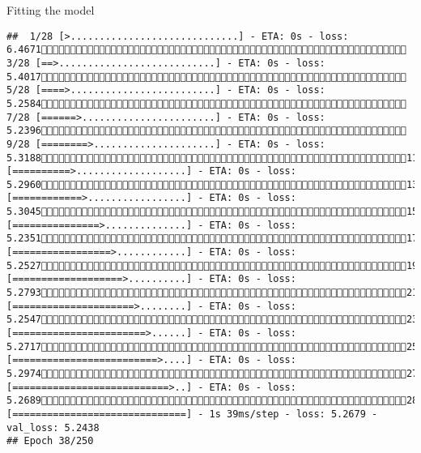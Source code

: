 \documentclass[
  ignorenonframetext,
]{beamer}
\begin{document}
\begin{frame}[fragile]{Fitting the model}
\begin{verbatim}
##  1/28 [>.............................] - ETA: 0s - loss: 6.4671 3/28 [==>...........................] - ETA: 0s - loss: 5.4017 5/28 [====>.........................] - ETA: 0s - loss: 5.2584 7/28 [======>.......................] - ETA: 0s - loss: 5.2396 9/28 [========>.....................] - ETA: 0s - loss: 5.318811/28 [==========>...................] - ETA: 0s - loss: 5.296013/28 [============>.................] - ETA: 0s - loss: 5.304515/28 [===============>..............] - ETA: 0s - loss: 5.235117/28 [=================>............] - ETA: 0s - loss: 5.252719/28 [===================>..........] - ETA: 0s - loss: 5.279321/28 [=====================>........] - ETA: 0s - loss: 5.254723/28 [=======================>......] - ETA: 0s - loss: 5.271725/28 [=========================>....] - ETA: 0s - loss: 5.297427/28 [===========================>..] - ETA: 0s - loss: 5.268928/28 [==============================] - 1s 39ms/step - loss: 5.2679 - val_loss: 5.2438
## Epoch 38/250

\end{verbatim}
\end{frame}
\end{document}
